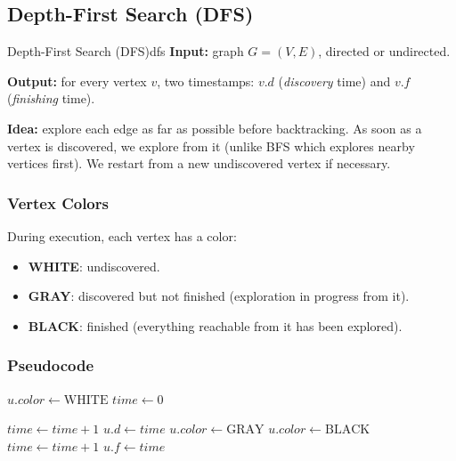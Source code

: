 \subsection{Depth-First Search (DFS)}

\begin{definition}{Depth-First Search (DFS)}{dfs}
\textbf{Input:} graph $G = (V,E)$, directed or undirected.

\textbf{Output:} for every vertex $v$, two timestamps:
$v.d$ (\emph{discovery} time) and $v.f$ (\emph{finishing} time).
\end{definition}

\textbf{Idea:} explore each edge as far as possible before backtracking.
As soon as a vertex is discovered, we explore from it (unlike BFS which
explores nearby vertices first). We restart from a new undiscovered
vertex if necessary.

\subsubsection{Vertex Colors}

During execution, each vertex has a color:
\begin{itemize}[noitemsep]
  \item \textbf{WHITE}: undiscovered.
  \item \textbf{GRAY}: discovered but not finished (exploration in progress from it).
  \item \textbf{BLACK}: finished (everything reachable from it has been explored).
\end{itemize}

\subsubsection{Pseudocode}

\begin{algorithm}[H]
\caption{DFS($G$)}
\begin{algorithmic}[1]
    \State $u.\mathit{color} \leftarrow \text{WHITE}$
\EndFor
\State $\mathit{time} \leftarrow 0$
        \State {}
    \EndIf
\EndFor
\end{algorithmic}
\end{algorithm}

\begin{algorithm}[H]
\caption{DFS-Visit($G$, $u$)}
\begin{algorithmic}[1]
\State $\mathit{time} \leftarrow \mathit{time} + 1$
\State $u.d \leftarrow \mathit{time}$             
\State $u.\mathit{color} \leftarrow \text{GRAY}$
        \State {}
    \EndIf
\EndFor
\State $u.\mathit{color} \leftarrow \text{BLACK}$
\State $\mathit{time} \leftarrow \mathit{time} + 1$
\State $u.f \leftarrow \mathit{time}$             
\end{algorithmic}
\end{algorithm}

